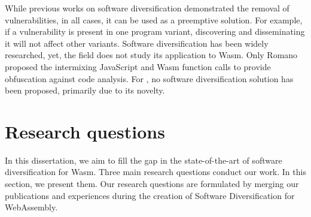 While previous works on software diversification demonstrated the removal of vulnerabilities, in all cases, it can be used as a preemptive solution.
For example, if a vulnerability is present in one program variant, discovering and disseminating it will not affect other variants.
Software diversification has been widely researched, yet, the field does not study its application to Wasm.
Only Romano \etal \cite{wobfuscator} proposed the intermixing JavaScript and Wasm function calls to provide obfuscation against code analysis. 
For \wasm, no software diversification solution has been proposed, primarily due to its novelty.







\section{Research questions}
\label{intro:definition:rq}

In this dissertation, we aim to fill the gap in the state-of-the-art of software diversification for Wasm.
Three main research questions conduct our work.
In this section, we present them. 
Our research questions are formulated by merging our publications and experiences during the creation of Software Diversification for WebAssembly. 


